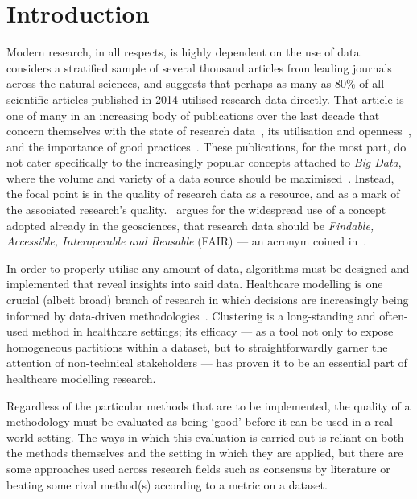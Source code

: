 \section{Introduction}\label{sec:intro}

Modern research, in all respects, is highly dependent on the use of
data.~\cite{Womack2015} considers a stratified sample of several thousand
articles from leading journals across the natural sciences, and suggests that
perhaps as many as 80\% of all scientific articles published in 2014 utilised
research data directly. That article is one of many in an increasing body of
publications over the last decade that concern themselves with the state of
research data~\cite{Higman2019}, its utilisation and
openness~\cite{Aslam2017,Zuiderwijk2020}, and the importance of good
practices~\cite{Colavizza2020,Corti2019}. These publications, for the most part,
do not cater specifically to the increasingly popular concepts attached to
\emph{Big Data}, where the volume and variety of a data source should be
maximised~\cite{Batisti2019}. Instead, the focal point is in the quality of
research data as a resource, and as a mark of the associated research's
quality.~\cite{Stall2019} argues for the widespread use of a concept adopted
already in the geosciences, that research data should be \emph{Findable,
Accessible, Interoperable and Reusable} (FAIR) --- an acronym coined
in~\cite{Wilkinson2016}.

In order to properly utilise any amount of data, algorithms must be designed and
implemented that reveal insights into said data. Healthcare modelling is one
crucial (albeit broad) branch of research in which decisions are increasingly
being informed by data-driven
methodologies~\cite{Alexander2018,Belle2015,RiosZertuche2020}. Clustering is a
long-standing and often-used method in healthcare settings; its efficacy --- as
a tool not only to expose homogeneous partitions within a dataset, but to
straightforwardly garner the attention of non-technical stakeholders --- has
proven it to be an essential part of healthcare modelling research.

Regardless of the particular methods that are to be implemented, the quality of
a methodology must be evaluated as being `good' before it can be used in a real
world setting. The ways in which this evaluation is carried out is reliant on
both the methods themselves and the setting in which they are applied, but there
are some approaches used across research fields such as consensus by literature
or beating some rival method(s) according to a metric on a dataset.

